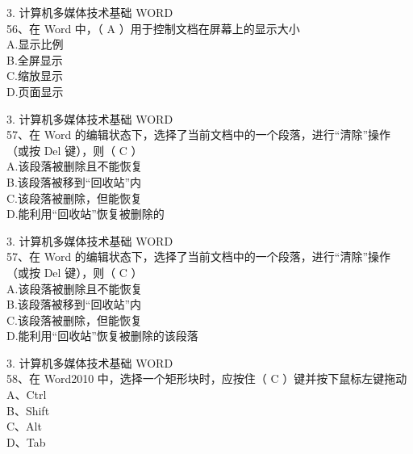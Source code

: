 \documentclass[aspectratio=169]{beamer}
\begin{document}
\begin{frame}[t]{3. 计算机多媒体技术基础} \vspace{20pt}
    WORD\\

56、在 Word 中，（ A ）用于控制文档在屏幕上的显示大小\\
A.显示比例\\ B.全屏显示\\ C.缩放显示\\ D.页面显示\\
\end{frame}




\begin{frame}[t]{3. 计算机多媒体技术基础} \vspace{20pt}
    WORD\\
57、在 Word 的编辑状态下，选择了当前文档中的一个段落，进行“清除”操作（或按 Del 键），则（ C ）\\
A.该段落被删除且不能恢复\\ B.该段落被移到“回收站”内\\
C.该段落被删除，但能恢复\\ D.能利用“回收站”恢复被删除的\\
\end{frame}


\begin{frame}[t]{3. 计算机多媒体技术基础} \vspace{20pt}
    WORD\\
57、在 Word 的编辑状态下，选择了当前文档中的一个段落，进行“清除”操作（或按 Del 键），则（ C ）\\
A.该段落被删除且不能恢复\\ B.该段落被移到“回收站”内\\
C.该段落被删除，但能恢复\\ D.能利用“回收站”恢复被删除的该段落\\
\end{frame}


\begin{frame}[t]{3. 计算机多媒体技术基础} \vspace{20pt}
    WORD\\
58、在 Word2010 中，选择一个矩形块时，应按住（ C ）键并按下鼠标左键拖动\\
A、Ctrl\\ B、Shift\\ C、Alt\\ D、Tab\\
\end{frame}
\end{document}
